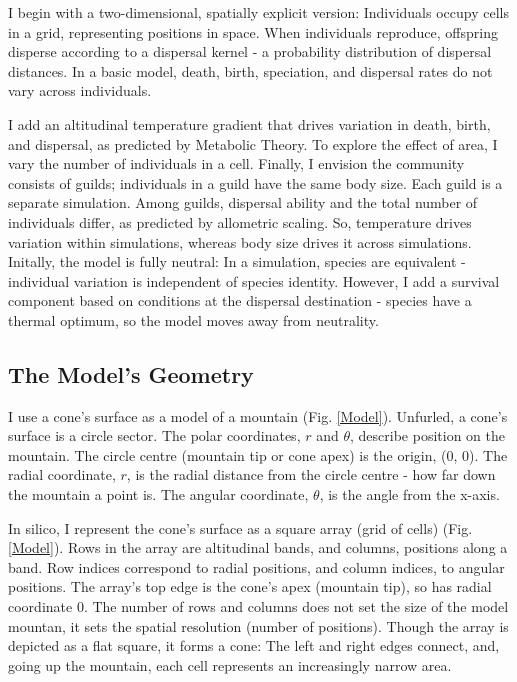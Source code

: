 \documentclass[11pt]{article}
\begin{document}
I begin with a two-dimensional, spatially explicit version: Individuals occupy cells in a grid, representing positions in space. When individuals reproduce, offspring disperse according to a dispersal kernel - a probability distribution of dispersal distances. In a basic model, death, birth, speciation, and dispersal rates do not vary across individuals.

I add an altitudinal temperature gradient that drives variation in death, birth, and dispersal, as predicted by Metabolic Theory. To explore the effect of area, I vary the number of individuals in a cell. Finally, I envision the community consists of guilds; individuals in a guild have the same body size. Each guild is a separate simulation. Among guilds, dispersal ability and the total number of individuals differ, as predicted by allometric scaling. So, temperature drives variation within simulations, whereas body size drives it across simulations. Initally, the model is fully neutral: In a simulation, species are equivalent - individual variation is independent of species identity. However, I add a survival component based on conditions at the dispersal destination - species have a thermal optimum, so the model moves away from neutrality.

\subsection*{The Model's Geometry}
I use a cone's surface as a model of a mountain (Fig. \ref{Model}). Unfurled, a cone's surface is a circle sector. The polar coordinates, $r$ and $\theta$, describe position on the mountain. The circle centre (mountain tip or cone apex) is the origin, (0, 0). The radial coordinate, $r$, is the radial distance from the circle centre - how far down the mountain a point is. The angular coordinate, $\theta$, is the angle from the x-axis.

In silico, I represent the cone's surface as a square array (grid of cells) (Fig. \ref{Model}). Rows in the array are altitudinal bands, and columns, positions along a band. Row indices correspond to radial positions, and column indices, to angular positions. The array's top edge is the cone's apex (mountain tip), so has radial coordinate 0.
The number of rows and columns does not set the size of the model mountan, it sets the spatial resolution (number of positions). Though the array is depicted as a flat square, it forms a cone: The left and right edges connect, and, going up the mountain, each cell represents an increasingly narrow area.
\end{document}
